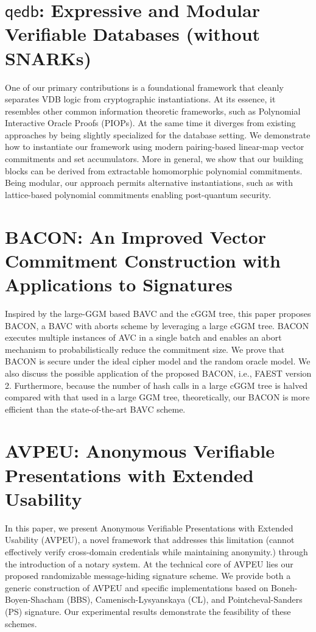 \documentclass[11pt]{article}
\theoremstyle{definition}
\theoremstyle{remark}
\theoremstyle{plain}
\begin{document}
\section{\cite{cryptoeprint:2025/1408} $\mathsf{qedb}$: Expressive and Modular Verifiable Databases (without {SNARKs})}
One of our primary contributions is a foundational framework that cleanly separates VDB logic from cryptographic instantiations. At its essence, it resembles other common information theoretic frameworks, such as Polynomial Interactive Oracle Proofs (PIOPs). At the same time it diverges from existing approaches by being slightly specialized for the database setting. We demonstrate how to instantiate our framework using modern pairing-based linear-map vector commitments and set accumulators. More in general, we show that our building blocks can be derived from extractable homomorphic polynomial commitments. Being  modular, our approach permits alternative instantiations, such as with lattice-based polynomial commitments enabling post-quantum security.

\section{\cite{cryptoeprint:2025/1411} BACON: An Improved Vector Commitment Construction with Applications to Signatures}
Inspired by the large-GGM based BAVC and the cGGM tree, this paper proposes BACON, a BAVC with aborts scheme by leveraging a large cGGM tree. BACON executes multiple instances of AVC in a single batch and enables an abort mechanism to probabilistically reduce the commitment size. We prove that BACON is secure under the ideal cipher model and the random oracle model. We also discuss the possible application of the proposed BACON, i.e., FAEST version 2. Furthermore, because the number of hash calls in a large cGGM tree is halved compared with that used in a large GGM tree, theoretically, our BACON is more efficient than the state-of-the-art BAVC scheme.

\section{\cite{cryptoeprint:2025/1412} AVPEU: Anonymous Verifiable Presentations with Extended Usability}

In this paper, we present Anonymous Verifiable Presentations with Extended Usability (AVPEU), a novel framework that addresses this limitation (cannot effectively verify cross-domain credentials while maintaining anonymity.) through the introduction of a notary system. At the technical core of AVPEU lies our proposed randomizable message-hiding signature scheme. We provide both a generic construction of AVPEU and specific implementations based on Boneh-Boyen-Shacham (BBS), Camenisch-Lysyanskaya (CL), and Pointcheval-Sanders (PS) signature. Our experimental results demonstrate the feasibility of these schemes.
\end{document}
